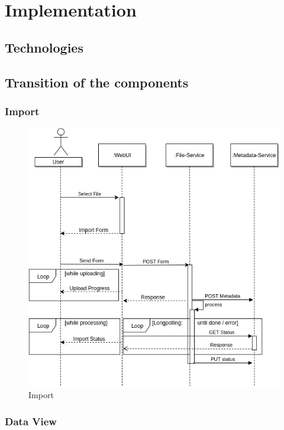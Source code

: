 
\chapter{Implementation}



\section{Technologies}


\section{Transition of the components}

\subsection{Import}
\begin{figure}[H]
	\centering\includegraphics[width=.75\textwidth]{res/Import}
	\caption{Import}
	\label{fig:import}
\end{figure}

\subsection{Data View}


